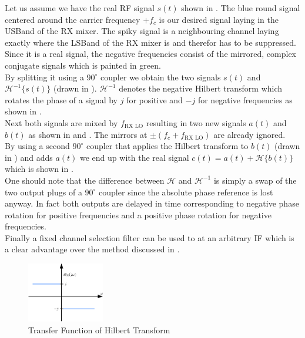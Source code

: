 Let us assume we have the real \gls{RF} signal $s(t)$ shown in
.
The blue round signal centered around the carrier frequency $+f_c$ is our
desired signal laying in the \gls{USBand} of the \gls{RX} mixer.
The spiky signal is a neighbouring channel laying exactly
where the \gls{LSBand} of the \gls{RX} mixer is and therefor has to
be suppressed.
Since it is a real signal, the negative frequencies consist of the mirrored,
complex conjugate signals which is painted in green. \\

By splitting it using a $90^\circ$ coupler we obtain the two signals
$s(t)$ and $\mathcal{H}^{-1}\{s(t)\}$ (drawn in ).
$\mathcal{H}^{-1}$ denotes the negative Hilbert transform which rotates the phase
of a signal by $j$ for positive and $-j$ for negative frequencies
as shown in . \\

Next both signals are mixed by $f_{\text{RX LO}}$ resulting in two new signals
$a(t)$ and $b(t)$ as shown in  and
.
The mirrors at $\pm (f_c + f_{\text{RX LO}})$ are already ignored. \\

By using a second $90^\circ$ coupler that applies the Hilbert transform
to $b(t)$ (drawn in )
and adds $a(t)$ we end up with the real signal
$c(t) = a(t) + \mathcal{H}\{b(t)\}$
which is shown in . \\

One should note that the difference between $\mathcal{H}$ and $\mathcal{H}^{-1}$
is simply a swap of the two output plugs of a $90^\circ$ coupler since
the absolute phase reference is lost anyway. In fact both outputs are delayed
in time corresponding to negative phase rotation for positive frequencies
and a positive phase rotation for negative frequencies. \\

Finally a fixed channel selection filter can be used to at an arbitrary \gls{IF}
which is a clear advantage over the method discussed in . \\

\begin{figure}[h!]
  \centering
  \includegraphics[width=0.3\textwidth]{figures/hilbert}
  \caption{Transfer Function of Hilbert Transform}
  \label{fig:hilbert}
\end{figure}

